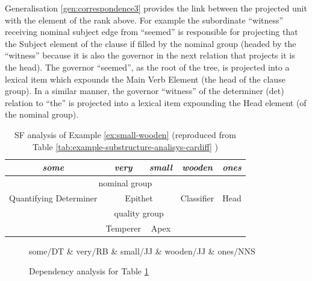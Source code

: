 Generalisation \ref{gen:correspondence3} provides the link between the projected unit with the element of the rank above. For example the subordinate ``witness'' receiving  nominal subject edge from ``seemed'' is responsible for projecting that the Subject element of the clause if filled by the nominal group (headed by the ``witness'' because it is also the governor in the next relation that projects it is the head). The governor ``seemed'', as the root of the tree, is projected into a lexical item which expounds the Main Verb Element (the head of the clause group). In a similar manner, the governor ``witness'' of the determiner (det) relation to ``the'' is projected into a lexical item expounding the Head element (of the nominal group). 


\begin{table}[ht]
	\centering
	\begin{tabular}{c|c|c|cc}
        \hline
        \multicolumn{1}{|c|}{\textit{some}}          & \textit{very}   & \textit{small}   & \multicolumn{1}{c|}{\textit{wooden}} & \multicolumn{1}{c|}{\textit{ones}} \\ \hline
        \multicolumn{5}{|c|}{nominal group}                                                                                                                           \\ \hline
        \multicolumn{1}{|c|}{Quantifying Determiner} & \multicolumn{2}{c|}{Epithet}       & \multicolumn{1}{c|}{Classifier}      & \multicolumn{1}{c|}{Head}          \\ \hline
        & \multicolumn{2}{c|}{quality group} &                                      &                                    \\ \cline{2-3}
        & Temperer        & Apex             &                                      &                                    \\ \cline{2-3}
    \end{tabular}
	\caption{SF analysis of Example \ref{ex:small-wooden} (reproduced from Table \ref{tab:example-substructure-analisys-cardiff} )}
	\label{tab:example-substructure-analisys-cardiff-repeated}
\end{table}

\begin{figure}[ht]
	\centering
	\begin{dependency}
		\begin{deptext}[]
			some/DT \& very/RB \& small/JJ \& wooden/JJ \& ones/NNS \\
		\end{deptext}
	\end{dependency}
	\caption{Dependency analysis for Table \ref{tab:example-substructure-analisys-cardiff-repeated} }
	\label{fig:small-wooden-dependency}
\end{figure}

